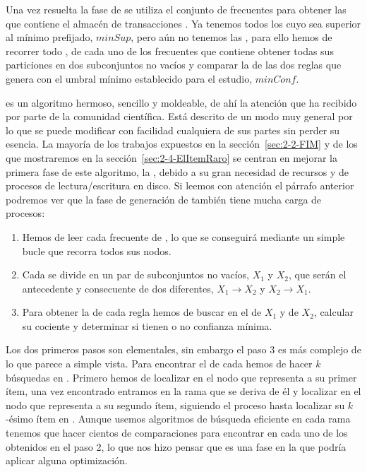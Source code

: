 Una vez resuelta la fase de \fim se utiliza el conjunto \aprioriL de \itemsets frecuentes para obtener las \ARs que contiene el almacén de transacciones \D. Ya tenemos todos los \itemsets cuyo \soporte sea superior al mínimo prefijado, $minSup$, pero aún no tenemos las \ARs, para ello hemos de recorrer todo \aprioriL, de cada uno de los \itemsets frecuentes que contiene obtener todas sus particiones en dos subconjuntos no vacíos y comparar la \confianza de las dos reglas que genera con el umbral mínimo establecido para el estudio, $minConf$.

\apriori es un algoritmo hermoso, sencillo y moldeable, de ahí la atención que ha recibido por parte de la comunidad científica. Está descrito de un modo muy general por lo que se puede modificar con facilidad cualquiera de sus partes sin perder su esencia. La mayoría de los trabajos expuestos en la sección~\ref{sec:2-2-FIM} y de los que mostraremos en la sección~\ref{sec:2-4-ElItemRaro} se centran en mejorar la primera fase de este algoritmo, la \fim, debido a su gran necesidad de recursos y de procesos de lectura/escritura en disco. Si leemos con atención el párrafo anterior podremos ver que la fase de generación de \ars también tiene mucha carga de procesos:

\begin{enumerate}
  \item Hemos de leer cada \itemset frecuente de \aprioriL, lo que se conseguirá mediante un simple bucle que recorra todos sus nodos.
  \item Cada \itemset se divide en un par de subconjuntos no vacíos, $X_1$ y $X_2$, que serán el antecedente y consecuente de dos \ARs diferentes, $X_1 \rightarrow X_2$ y $X_2 \rightarrow X_1$.
  \item Para obtener la \confianza de cada regla hemos de buscar en \aprioriL el \soporte de $X_1$ y de $X_2$, calcular su cociente y determinar si tienen o no confianza mínima.
\end{enumerate}

Los dos primeros pasos son elementales, sin embargo el paso 3 es más complejo de lo que parece a simple vista. Para encontrar el \soporte de cada \kitemset hemos de hacer $k$ búsquedas en \aprioriL. Primero hemos de localizar en \aprioriL[1] el nodo que representa a su primer ítem, una vez encontrado entramos en la rama que se deriva de él y localizar en \aprioriL[2] el nodo que representa a su segundo ítem, siguiendo el proceso hasta localizar su $k$-ésimo ítem en \aprioriL[k]. Aunque usemos algoritmos de búsqueda eficiente en cada rama tenemos que hacer cientos de comparaciones para encontrar en \aprioriL cada uno de los \itemsets obtenidos en el paso 2, lo que nos hizo pensar que es una fase en la que podría aplicar alguna optimización.
